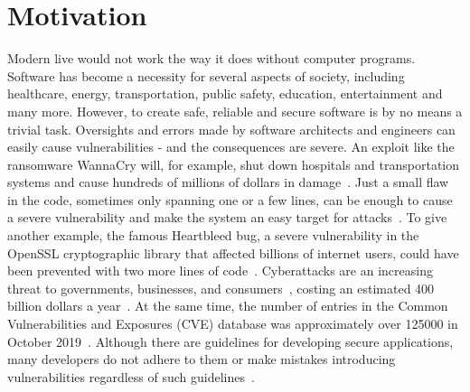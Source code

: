 \documentclass[
a4paper,
pagesize,
pdftex,
12pt,
twoside, %
BCOR=5mm, %
ngerman,
fleqn,
final,
]{scrartcl}
\begin{document}
	
	\setcounter{secnumdepth}{5} %
	
	\newpage
	\section{Motivation}\label{Motivation}
	Modern live would not work the way it does without computer programs. Software has become a necessity for several aspects of society, including healthcare, energy, transportation, public safety, education, entertainment and many more. However, to create safe, reliable and secure software is by no means a trivial task. Oversights and errors made by software architects and engineers can easily cause vulnerabilities - and the consequences are severe. An exploit like the ransomware WannaCry will, for example, shut down hospitals and transportation systems and cause hundreds of millions of dollars in damage~\cite{DanGoodin.2017}. Just a small flaw in the code, sometimes only spanning one or a few lines, can be enough to cause a severe vulnerability and make the system an easy target for attacks~\cite{Yamaguchi.2012}. To give another example, the famous Heartbleed bug, a severe vulnerability in the OpenSSL cryptographic library that affected billions of internet users, could have been prevented with two more lines of code~\cite{Durumeric.2014}. Cyberattacks are an increasing threat to governments, businesses, and consumers~\cite{Dam.2017}, costing an estimated 400 billion dollars a year~\cite{Losses.2014}. At the same time, the number of entries in the Common Vulnerabilities and Exposures (CVE) database was approximately over 125000 in October 2019~\cite{CVE}. Although there are guidelines for developing secure applications, many developers do not adhere to them or make mistakes introducing vulnerabilities regardless of such guidelines~\cite{Gupta.2014}.\\
\end{document}
